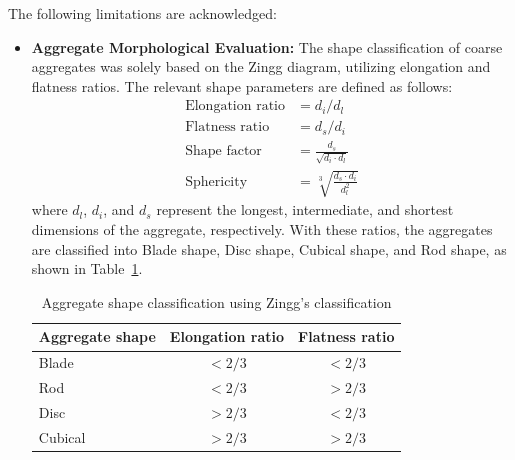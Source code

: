 \documentclass[12pt,a4paper]{article}
\begin{document}
The following limitations are acknowledged:
\begin{itemize}
    \item \textbf{Aggregate Morphological Evaluation:} The shape classification of coarse aggregates was solely based on the Zingg diagram, utilizing elongation and flatness ratios. The relevant shape parameters are defined as follows:
    \begin{align*}
        \text{Elongation ratio} &= d_i / d_l \\
        \text{Flatness ratio} &= d_s / d_i \\
        \text{Shape factor} &= \frac{d_s}{\sqrt{d_i \cdot d_l}} \\
        \text{Sphericity} &= \sqrt[3]{\frac{d_s \cdot d_i}{d_l^2}}
    \end{align*}
    where $d_l$, $d_i$, and $d_s$ represent the longest, intermediate, and shortest dimensions of the aggregate, respectively. With these ratios, the aggregates are classified into Blade shape, Disc shape, Cubical shape, and Rod shape, as shown in Table~\ref{tab:shape_classification_limitations}.
    
    \begin{table}[H]
        \centering
        \caption{Aggregate shape classification using Zingg's classification}
        \label{tab:shape_classification_limitations}
        \begin{tabular}{@{}lcc@{}}
            \toprule
            \textbf{Aggregate shape} & \textbf{Elongation ratio} & \textbf{Flatness ratio} \\
            \midrule
            Blade & $< 2/3$ & $< 2/3$ \\
            Rod & $< 2/3$ & $> 2/3$ \\
            Disc & $> 2/3$ & $< 2/3$ \\
            Cubical & $> 2/3$ & $> 2/3$ \\
            \bottomrule
        \end{tabular}
    \end{table}


\end{itemize}
\end{document}
